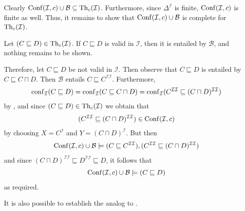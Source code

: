 \begin{Proof}
  Clearly $\operatorname{Conf}(\mathcal{I}, c) \cup \mathcal{B} \subseteq \operatorname{Th}_c(\mathcal{I})$.
  Furthermore, since $\Delta^{\mathcal{I}}$ is finite, $\operatorname{Conf}(\mathcal{I}, c)$ is finite
  as well.  Thus, it remains to show that $\operatorname{Conf}(\mathcal{I}, c) \cup \mathcal{B}$ is
  complete for $\operatorname{Th}_c(\mathcal{I})$.

  Let $(C \sqsubseteq D) \in \operatorname{Th}_c(\mathcal{I})$.  If $C \sqsubseteq D$ is valid in
  $\mathcal{I}$, then it is entailed by $\mathcal{B}$, and nothing remains to be shown.

  Therefore, let $C \sqsubseteq D$ be not valid in $\mathcal{I}$.  Then observe that $C
  \sqsubseteq D$ is entailed by $C \sqsubseteq C \sqcap D$.  Then $\mathcal{B}$ entails $C
  \sqsubseteq C^{\mathcal{I}\mathcal{I}}$.  Furthermore,
  \begin{equation*}
    \operatorname{conf}_{\mathcal{I}}( C \sqsubseteq D ) = \operatorname{conf}_{\mathcal{I}}( C \sqsubseteq C \sqcap D
    ) = \operatorname{conf}_{\mathcal{I}}( C^{\mathcal{I}\mathcal{I}} \sqsubseteq (C \sqcap
    D)^{\mathcal{I}\mathcal{I}} )
  \end{equation*}
  by , and since $(C \sqsubseteq D) \in
  \operatorname{Th}_c(\mathcal{I})$ we obtain that
  \begin{equation*}
    (C^{\mathcal{I}\mathcal{I}} \sqsubseteq (C \sqcap D)^{\mathcal{I}\mathcal{I}}) \in
    \operatorname{Conf}(\mathcal{I}, c)
  \end{equation*}
  by choosing $X = C^{\mathcal{I}}$ and $Y = (C \sqcap D)^{\mathcal{I}}$.  But then
  \begin{equation*}
    \operatorname{Conf}(\mathcal{I}, c) \cup \mathcal{B} \models (C \sqsubseteq
    C^{\mathcal{I}\mathcal{I}}), (C^{\mathcal{I}\mathcal{I}} \sqsubseteq (C \sqcap
    D)^{\mathcal{I}\mathcal{I}})
  \end{equation*}
  and since $(C \sqcap D)^{\mathcal{I}\mathcal{I}} \sqsubseteq D^{\mathcal{I}\mathcal{I}}
  \sqsubseteq D$, it follows that
  \begin{equation*}
    \operatorname{Conf}(\mathcal{I}, c) \cup \mathcal{B} \models (C \sqsubseteq D)
  \end{equation*}
  as required.
\end{Proof}

It is also possible to establish the analog to .

